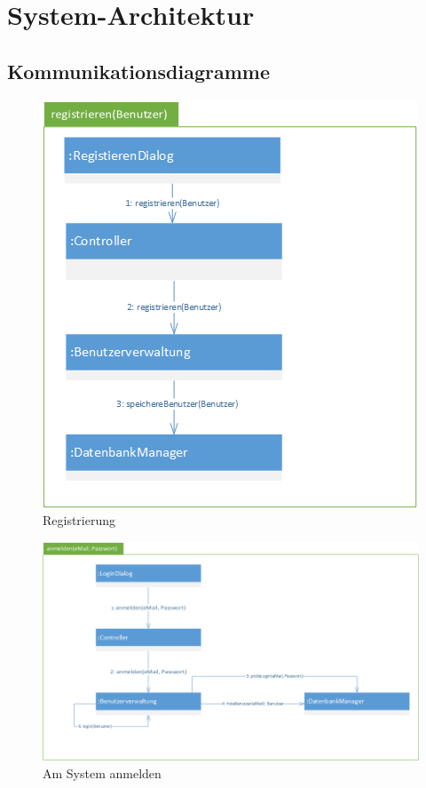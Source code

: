 \documentclass[12pt]{scrreprt}
\begin{document}
\chapter{System-Architektur}

\section{Kommunikationsdiagramme}

\begin{figure}[H]
	\centering
	\includegraphics[width=0.7\linewidth]{Bilder/Kommunikationsdiagramme/registrieren}
	\caption{Registrierung}
	\label{Registrierung}
\end{figure}

\begin{figure}[H]
\centering
\includegraphics[width=0.7\linewidth]{Bilder/Kommunikationsdiagramme/anmelden}
\caption{Am System anmelden}
\label{Am System anmelden}
\end{figure}
\end{document}
